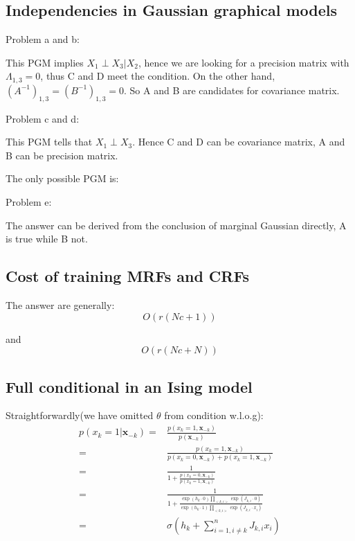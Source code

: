 \documentclass[UTF8]{ctexart}
\begin{document}
\subsection{Independencies in Gaussian graphical models}
Problem a and b:

This PGM implies $X_{1} \perp X_{3}|X_{2}$, hence we are looking for a precision matrix with $\Lambda_{1,3}=0$, thus C and D meet the condition. On the other hand, $(A^{-1})_{1,3}=(B^{-1})_{1,3}=0$. So A and B are candidates for covariance matrix.

Problem c and d:

This PGM tells that $X_{1} \perp X_{3}$. Hence C and D can be covariance matrix, A and B can be precision matrix. 

The only possible PGM is:
\begin{figure}[h]
\small
\centering
{}
\end{figure}

Problem e:

The answer can be derived from the conclusion of marginal Gaussian directly, A is true while B not.

\subsection{Cost of training MRFs and CRFs}
The answer are generally:
$$O(r(Nc+1))$$

and
$$O(r(Nc+N))$$

\subsection{Full conditional in an Ising model}
Straightforwardly(we have omitted $\theta$ from condition w.l.o.g):
\begin{align}
p(x_{k}=1|\textbf{x}_{-k})=&\frac{p(x_{k}=1,\textbf{x}_{-k})}{p(\textbf{x}_{-k})} \nonumber \\
=&\frac{p(x_{k}=1,\textbf{x}_{-k})}{p(x_{k}=0,\textbf{x}_{-k})+p(x_{k}=1,\textbf{x}_{-k})} \nonumber \\
=&\frac{1}{1+\frac{p(x_{k}=0,\textbf{x}_{-k})}{p(x_{k}=1,\textbf{x}_{-k})}} \nonumber \\
=&\frac{1}{1+\frac{\exp(h_{k}\cdot 0)\prod_{<k,i>}\exp(J_{k,i}\cdot 0)}{\exp(h_{k}\cdot 1)\prod_{<k,i>}\exp(J_{k,i}\cdot x_{i})}} \nonumber \\
=&\sigma(h_{k}+\sum_{i=1,i\neq k}^{n}J_{k,i}x_{i}) \nonumber
\end{align}
\end{document}
